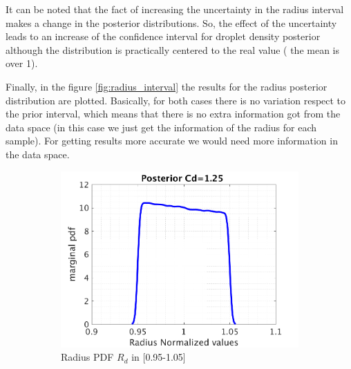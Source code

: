 \documentclass{article}
\begin{document}
It can be noted that the fact of increasing the uncertainty in the radius interval makes a change in the posterior distributions. So, the effect of the uncertainty leads to an increase of the confidence interval for droplet density posterior although the distribution is practically centered to the real value ( the mean is over 1).

Finally, in the figure \ref{fig:radius_interval} the results for the radius posterior distribution are plotted.  Basically,  for both cases there is no variation respect to the prior interval, which means that there is no extra information got from the data space (in this case we just get the information of the radius for each sample). For getting results more accurate we would need more information in the data space.
\begin{figure}[H]
\captionsetup[subfigure]{justification=centering}
\begin{center}
  \begin{subfigure}{0.4\textwidth}
    \centering\includegraphics[width=1.1\textwidth,keepaspectratio]{images/inverse_problem/infer_radius/drag_125/range_short/radiusraw_PDF.png}
    \caption{\centering Radius PDF  $R_d$ in [0.95-1.05]}
  \end{subfigure}
 \begin{subfigure}{0.4\textwidth}

\end{subfigure}
\end{center}
\end{figure}
\end{document}
